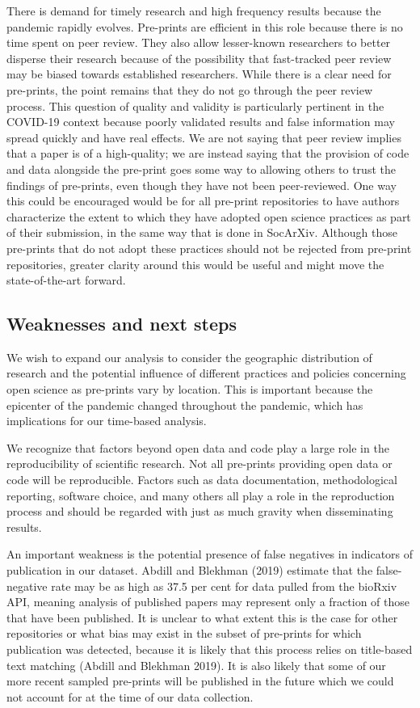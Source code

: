 \documentclass[
]{article}
\begin{document}
There is demand for timely research and high frequency results because the pandemic rapidly evolves. Pre-prints are efficient in this role because there is no time spent on peer review. They also allow lesser-known researchers to better disperse their research because of the possibility that fast-tracked peer review may be biased towards established researchers. While there is a clear need for pre-prints, the point remains that they do not go through the peer review process. This question of quality and validity is particularly pertinent in the COVID-19 context because poorly validated results and false information may spread quickly and have real effects. We are not saying that peer review implies that a paper is of a high-quality; we are instead saying that the provision of code and data alongside the pre-print goes some way to allowing others to trust the findings of pre-prints, even though they have not been peer-reviewed. One way this could be encouraged would be for all pre-print repositories to have authors characterize the extent to which they have adopted open science practices as part of their submission, in the same way that is done in SocArXiv. Although those pre-prints that do not adopt these practices should not be rejected from pre-print repositories, greater clarity around this would be useful and might move the state-of-the-art forward.

\hypertarget{weaknesses-and-next-steps}{%
\subsection{Weaknesses and next steps}\label{weaknesses-and-next-steps}}

We wish to expand our analysis to consider the geographic distribution of research and the potential influence of different practices and policies concerning open science as pre-prints vary by location. This is important because the epicenter of the pandemic changed throughout the pandemic, which has implications for our time-based analysis.

We recognize that factors beyond open data and code play a large role in the reproducibility of scientific research. Not all pre-prints providing open data or code will be reproducible. Factors such as data documentation, methodological reporting, software choice, and many others all play a role in the reproduction process and should be regarded with just as much gravity when disseminating results.

An important weakness is the potential presence of false negatives in indicators of publication in our dataset. Abdill and Blekhman (2019) estimate that the false-negative rate may be as high as 37.5 per cent for data pulled from the bioRxiv API, meaning analysis of published papers may represent only a fraction of those that have been published. It is unclear to what extent this is the case for other repositories or what bias may exist in the subset of pre-prints for which publication was detected, because it is likely that this process relies on title-based text matching (Abdill and Blekhman 2019). It is also likely that some of our more recent sampled pre-prints will be published in the future which we could not account for at the time of our data collection.
\end{document}
